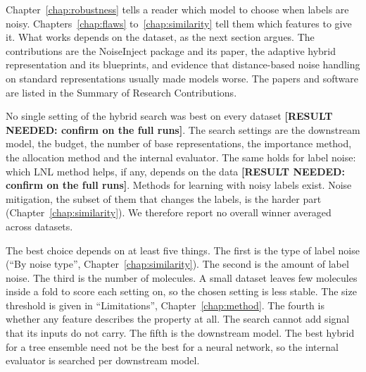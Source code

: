 Chapter~\ref{chap:robustness} tells a reader which model to choose when labels are noisy. Chapters~\ref{chap:flaws} to~\ref{chap:similarity} tell them which features to give it. What works depends on the dataset, as the next section argues. The contributions are the NoiseInject package and its paper, the adaptive hybrid representation and its blueprints, and evidence that distance-based noise handling on standard representations usually made models worse. The papers and software are listed in the Summary of Research Contributions.

No single setting of the hybrid search was best on every dataset \textbf{[RESULT NEEDED: confirm on the full runs]}. The search settings are the downstream model, the budget, the number of base representations, the importance method, the allocation method and the internal evaluator. The same holds for label noise: which LNL method helps, if any, depends on the data \textbf{[RESULT NEEDED: confirm on the full runs]}. Methods for learning with noisy labels exist. Noise mitigation, the subset of them that changes the labels, is the harder part (Chapter~\ref{chap:similarity}). We therefore report no overall winner averaged across datasets.

The best choice depends on at least five things. The first is the type of label noise (``By noise type'', Chapter~\ref{chap:similarity}). The second is the amount of label noise. The third is the number of molecules. A small dataset leaves few molecules inside a fold to score each setting on, so the chosen setting is less stable. The size threshold is given in ``Limitations'', Chapter~\ref{chap:method}. The fourth is whether any feature describes the property at all. The search cannot add signal that its inputs do not carry. The fifth is the downstream model. The best hybrid for a tree ensemble need not be the best for a neural network, so the internal evaluator is searched per downstream model.

